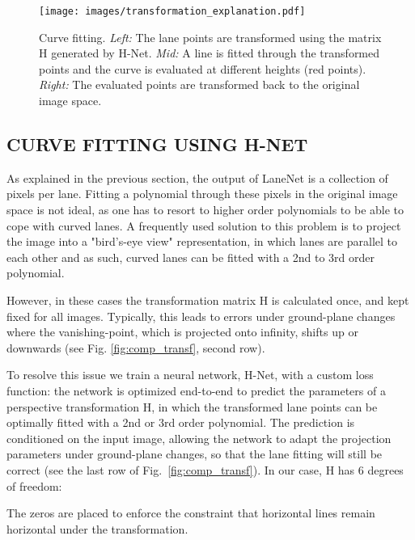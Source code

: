 \documentclass[letterpaper, 10 pt, conference]{ieeeconf}
\begin{document}
\begin{figure}[t]
	\begin{center}
		\texttt{[image: images/transformation\_explanation.pdf]}
	\end{center}
	\caption{Curve fitting. 
    {\it Left:}
    The lane points are transformed using the matrix H generated by H-Net. 
    {\it Mid:}
    A line is fitted through the transformed points and the curve is evaluated at different heights (red points). 
    {\it Right:}
    The evaluated points are transformed back to the original image space.}
	\label{fig:transformation_explanation}
\end{figure}


\subsection{CURVE FITTING USING H-NET}
\label{subsec:lane_fitting}

As explained in the previous section, the output of LaneNet is a collection of pixels per lane. Fitting a polynomial through these pixels in the original image space is not ideal, as one has to resort to higher order polynomials to be able to cope with curved lanes. A frequently used solution to this problem is to project the image into a "bird's-eye view" representation, in which lanes are parallel to each other and as such, curved lanes can be fitted with a 2nd to 3rd order polynomial. 

However, in these cases the transformation matrix H is calculated once, and kept fixed for all images. Typically, this leads to errors under ground-plane changes where the vanishing-point, which is projected onto infinity, shifts up or downwards (see Fig. \ref{fig:comp_transf}, second row).

To resolve this issue we train a neural network, H-Net, with a custom loss function: the network is optimized end-to-end to predict the parameters of a perspective transformation H, in which the transformed lane points can be optimally fitted with a 2nd or 3rd order polynomial. The prediction is conditioned on the input image, allowing the network to adapt the projection parameters under ground-plane changes, so that the lane fitting will still be correct (see the last row of Fig.~\ref{fig:comp_transf}). In our case, H has 6 degrees of freedom: 



The zeros are placed to enforce the constraint that horizontal lines remain horizontal under the transformation. 
\end{document}
